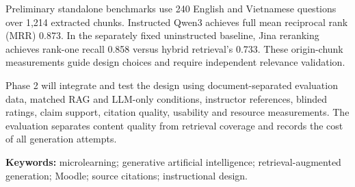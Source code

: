 \documentclass[oneside,final]{hcmut-report}
\begin{document}
Preliminary standalone benchmarks use 240 English and Vietnamese questions over 1,214 extracted chunks. Instructed Qwen3 achieves full mean reciprocal rank (MRR) 0.873. In the separately fixed uninstructed baseline, Jina reranking achieves rank-one recall 0.858 versus hybrid retrieval's 0.733. These origin-chunk measurements guide design choices and require independent relevance validation.

Phase 2 will integrate and test the design using document-separated evaluation data, matched RAG and LLM-only conditions, instructor references, blinded ratings, claim support, citation quality, usability and resource measurements. The evaluation separates content quality from retrieval coverage and records the cost of all generation attempts.

\noindent\textbf{Keywords:} microlearning; generative artificial intelligence; retrieval-augmented generation; Moodle; source citations; instructional design.
\clearpage
\tableofcontents
\listoffigures
\listoftables
\clearpage

\clearpage
{}
\pagestyle{fancy}












\appendix

\clearpage
{}
{}


\end{document}
